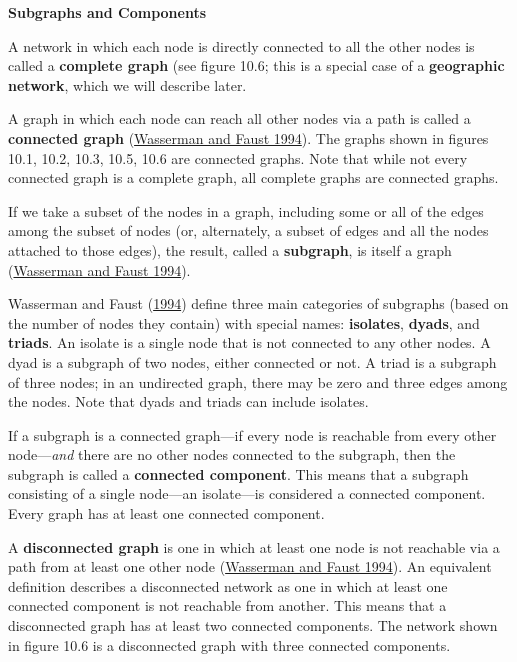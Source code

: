 \documentclass{book}
\begin{document}
\textbf{Subgraphs and Components}

A network in which each node is directly connected to all the other nodes is
called a \textbf{complete graph} (see figure 10.6; this is a special case of a
\textbf{geographic network}, which we will describe later.

A graph in which each node can reach all other nodes via a path is called a
\textbf{connected graph} (\protect\hyperlink{ref-WassermanFaust1994}{Wasserman
and Faust 1994}). The graphs shown in figures 10.1, 10.2, 10.3, 10.5, 10.6 are
connected graphs. Note that while not every connected graph is a complete
graph, all complete graphs are connected graphs.

If we take a subset of the nodes in a graph, including some or all of the
edges among the subset of nodes (or, alternately, a subset of edges and all
the nodes attached to those edges), the result, called a \textbf{subgraph}, is
itself a graph (\protect\hyperlink{ref-WassermanFaust1994}{Wasserman and Faust
1994}).

Wasserman and Faust (\protect\hyperlink{ref-WassermanFaust1994}{1994}) define
three main categories of subgraphs (based on the number of nodes they contain)
with special names: \textbf{isolates}, \textbf{dyads}, and \textbf{triads}. An
isolate is a single node that is not connected to any other nodes. A dyad is a
subgraph of two nodes, either connected or not. A triad is a subgraph of three
nodes; in an undirected graph, there may be zero and three edges among the
nodes. Note that dyads and triads can include isolates.

If a subgraph is a connected graph---if every node is reachable from every
other node---\emph{and} there are no other nodes connected to the subgraph,
then the subgraph is called a \textbf{connected component}. This means that a
subgraph consisting of a single node---an isolate---is considered a connected
component. Every graph has at least one connected component.

A \textbf{disconnected graph} is one in which at least one node is not
reachable via a path from at least one other node
(\protect\hyperlink{ref-WassermanFaust1994}{Wasserman and Faust 1994}). An
equivalent definition describes a disconnected network as one in which at
least one connected component is not reachable from another. This means that a
disconnected graph has at least two connected components. The network shown in
figure 10.6 is a disconnected graph with three connected components.
\end{document}
